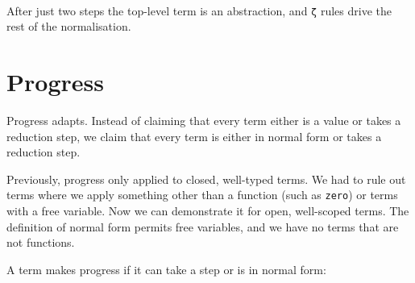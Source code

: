 \begin{fence}
\begin{code}
\AgdaSymbol{(}\AgdaSpace{}%
\AgdaOperator{\AgdaFunction{\#}}\AgdaSpace{}%
\AgdaSpace{}%
\AgdaSpace{}%
\AgdaSymbol{(}\AgdaOperator{\AgdaFunction{\#}}\AgdaSpace{}%
\AgdaSpace{}%
\AgdaSpace{}%
\AgdaSymbol{(}\AgdaOperator{\AgdaFunction{\#}}\AgdaSpace{}%
\AgdaSpace{}%
\AgdaSpace{}%
\AgdaSymbol{(}\AgdaOperator{\AgdaFunction{\#}}\AgdaSpace{}%
\AgdaSpace{}%
\AgdaSpace{}%
\AgdaOperator{\AgdaFunction{\#}}\AgdaSpace{}%
\AgdaSymbol{))))}\<%
\\
%
\>[2]\<%
\end{code}
\end{fence}

After just two steps the top-level term is an abstraction, and
\texttt{ζ} rules drive the rest of the normalisation.

\hypertarget{progress}{%
\section{Progress}\label{progress}}

Progress adapts. Instead of claiming that every term either is a value
or takes a reduction step, we claim that every term is either in normal
form or takes a reduction step.

Previously, progress only applied to closed, well-typed terms. We had to
rule out terms where we apply something other than a function (such as
\texttt{\textasciigrave{}zero}) or terms with a free variable. Now we
can demonstrate it for open, well-scoped terms. The definition of normal
form permits free variables, and we have no terms that are not
functions.

A term makes progress if it can take a step or is in normal form:

